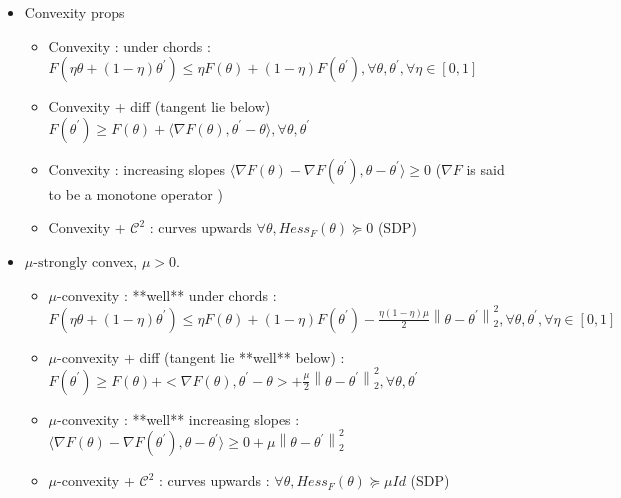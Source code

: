 \documentclass{article}
\theoremstyle{plain}%
\theoremstyle{definition}
\theoremstyle{remark}
\begin{document}
\begin{itemize}
    \item Convexity props \begin{itemize}
        \item Convexity : under chords : $ F(\eta \theta + (1 - \eta ) \theta ^\prime ) \leq  \eta F(\theta ) + (1 - \eta ) F(\theta ^\prime ), \forall \theta , \theta ^\prime , \forall \eta  \in [0, 1] $ 
        \item Convexity + diff (tangent lie below) $ F(\theta ^\prime ) \geq F(\theta ) + \langle  \nabla F(\theta ) , \theta ^\prime - \theta  \rangle ,  \forall \theta , \theta ^\prime $ 
        \item Convexity : increasing slopes $ \langle \nabla F(\theta ) - \nabla F(\theta ^\prime ), \theta - \theta ^\prime \rangle \geq 0 $ ($ \nabla F $ is said to be a monotone operator )
        \item Convexity + $ \mathcal{C}^2 $ : curves upwards $ \forall \theta , Hess_F (\theta ) \succeq 0 $ (SDP)
    \end{itemize}
    \item $ \mu \text{-strongly}$ convex, $ \mu > 0 $. \begin{itemize}
        \item $\mu$-convexity : **well** under chords : $ F(\eta \theta + (1 - \eta ) \theta ^\prime ) \leq  \eta F(\theta ) + (1 - \eta ) F(\theta ^\prime ) - \frac{\eta (1 - \eta ) \mu }{2} \left\| \theta - \theta ^\prime  \right\| ^2 _2 , \forall \theta , \theta ^\prime , \forall \eta  \in [0, 1] $ 
        \item $\mu$-convexity + diff (tangent lie **well** below) : $ F(\theta ^\prime ) \geq F(\theta ) + < \nabla F(\theta ) , \theta ^\prime - \theta  > + \frac{\mu }{2} \left\| \theta - \theta ^\prime  \right\|^2_2, \forall \theta , \theta ^\prime  $ 
        \item $\mu$-convexity : **well** increasing slopes : $ \langle \nabla F(\theta ) - \nabla F(\theta ^\prime ), \theta - \theta ^\prime \rangle \geq 0 + \mu \left\| \theta - \theta ^\prime  \right\| _2 ^2  $
        \item $\mu$-convexity + $ \mathcal{C}^2 $ : curves upwards : $ \forall \theta , Hess_F (\theta ) \succeq \mu Id $ (SDP)
    \end{itemize}
\end{itemize}
\end{document}
